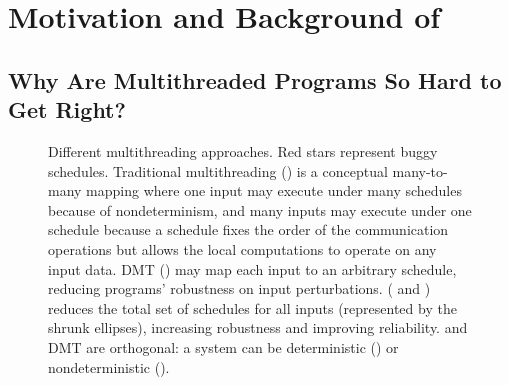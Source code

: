 \chapter{Motivation and Background of \smt} \label{sec:smt-motivation}

\section{Why Are Multithreaded Programs So Hard to Get Right?} \label{sec:why}

\begin{figure}[t]
\begin{center}
\vspace{-.05in}
\caption{Different multithreading approaches. Red stars represent buggy
  schedules.  Traditional multithreading ()
  is a conceptual many-to-many mapping where one input may execute under
  many schedules because of nondeterminism, and many inputs may execute
  under one schedule because a schedule fixes the order of the
  communication operations but allows the local computations to operate on
  any input data.  DMT () may
  map each input to an arbitrary schedule, reducing programs' robustness
  on input perturbations.  \smt ( and
  ) reduces the total set of schedules for all inputs (represented by the shrunk ellipses),
  increasing robustness and improving reliability.
  \smt and DMT are orthogonal: a \smt system can be deterministic
  () or nondeterministic ().}
\vspace{-.2in}
\end{center}
\end{figure}

